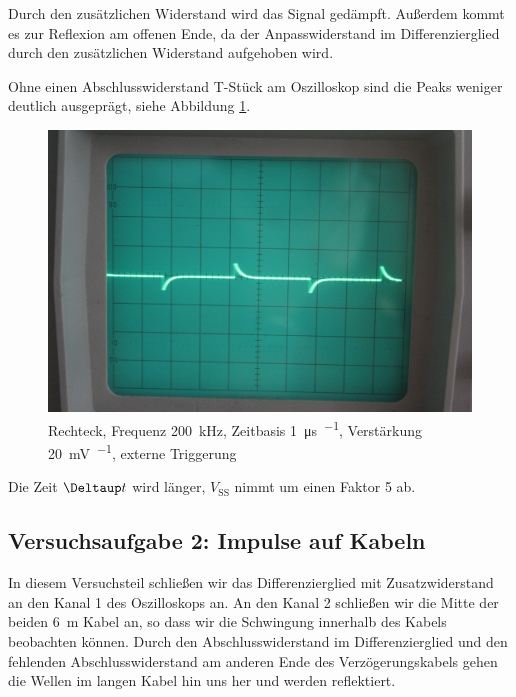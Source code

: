 Durch den zusätzlichen Widerstand wird das Signal gedämpft. Außerdem kommt es zur Reflexion am offenen Ende, da der Anpasswiderstand im Differenzierglied durch den zusätzlichen Widerstand aufgehoben wird.

Ohne einen Abschlusswiderstand T-Stück am Oszilloskop sind die Peaks weniger deutlich ausgeprägt, siehe Abbildung \ref{fig:0755}.

\begin{figure}
	\centering
	\begin{minipage}{.45\linewidth}
	\end{minipage}
	\hfill
	\begin{minipage}{.45\linewidth}
	\includegraphics[width=\linewidth]{Fotos/IMG_0755-1500.jpg}
	\end{minipage}
	\caption{%
		Rechteck, Frequenz \SI{200}{\kilo\hertz}, Zeitbasis \SI{1}{\micro\second\per\division}, Verstärkung \SI{20}{\milli\volt\per\division}, externe Triggerung
	}
	\label{fig:0755}
\end{figure}

Die Zeit $\Deltaup t$ wird länger, $V_\text{SS}$ nimmt um einen Faktor 5 ab.

\FloatBarrier
\subsection{Versuchsaufgabe 2: Impulse auf Kabeln}

In diesem Versuchsteil schließen wir das Differenzierglied mit Zusatzwiderstand
an den Kanal 1 des Oszilloskops an. An den Kanal 2 schließen wir die Mitte der
beiden \SI{6}{\meter} Kabel an, so dass wir die Schwingung innerhalb des Kabels
beobachten können. Durch den Abschlusswiderstand im Differenzierglied und den
fehlenden Abschlusswiderstand am anderen Ende des Verzögerungskabels gehen die
Wellen im langen Kabel hin uns her und werden reflektiert.

